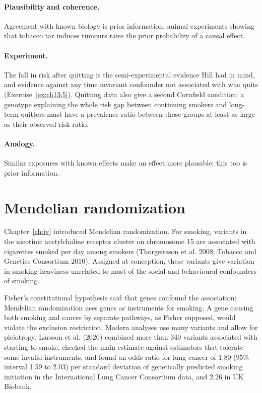 \paragraph{Plausibility and coherence.} Agreement with known biology is prior information: animal experiments showing that tobacco tar induces tumours raise the prior probability of a causal effect.

\paragraph{Experiment.} The fall in risk after quitting is the semi-experimental evidence Hill had in mind, and evidence against any time invariant confounder not associated with who quits (Exercise~\ref{ex:ch13:5}). Quitting data also give a second Cornfield condition: a genotype explaining the whole risk gap between continuing smokers and long-term quitters must have a prevalence ratio between those groups at least as large as their observed risk ratio.

\paragraph{Analogy.} Similar exposures with known effects make an effect more plausible; this too is prior information.

\section{Mendelian randomization}

Chapter~\ref{ch:iv} introduced Mendelian randomization. For smoking, variants in the nicotinic acetylcholine receptor cluster on chromosome 15 are associated with cigarettes smoked per day among smokers (Thorgeirsson et al. 2008; Tobacco and Genetics Consortium 2010). Assigned at conception, these variants give variation in smoking heaviness unrelated to most of the social and behavioural confounders of smoking.

Fisher's constitutional hypothesis said that genes confound the association; Mendelian randomization uses genes as instruments for smoking. A gene causing both smoking and cancer by separate pathways, as Fisher supposed, would violate the exclusion restriction. Modern analyses use many variants and allow for pleiotropy. Larsson et al. (2020) combined more than 340 variants associated with starting to smoke, checked the main estimate against estimators that tolerate some invalid instruments, and found an odds ratio for lung cancer of 1.80 (95\% interval 1.59 to 2.03) per standard deviation of genetically predicted smoking initiation in the International Lung Cancer Consortium data, and 2.26 in UK Biobank.

